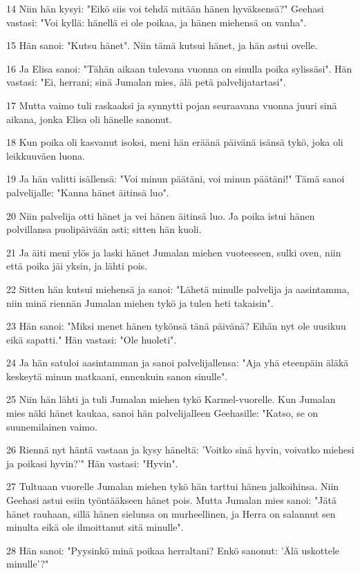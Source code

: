 \par 14 Niin hän kysyi: "Eikö siis voi tehdä mitään hänen hyväksensä?" Geehasi vastasi: "Voi kyllä: hänellä ei ole poikaa, ja hänen miehensä on vanha".
\par 15 Hän sanoi: "Kutsu hänet". Niin tämä kutsui hänet, ja hän astui ovelle.
\par 16 Ja Elisa sanoi: "Tähän aikaan tulevana vuonna on sinulla poika sylissäsi". Hän vastasi: "Ei, herrani; sinä Jumalan mies, älä petä palvelijatartasi".
\par 17 Mutta vaimo tuli raskaaksi ja synnytti pojan seuraavana vuonna juuri sinä aikana, jonka Elisa oli hänelle sanonut.
\par 18 Kun poika oli kasvanut isoksi, meni hän eräänä päivänä isänsä tykö, joka oli leikkuuväen luona.
\par 19 Ja hän valitti isällensä: "Voi minun päätäni, voi minun päätäni!" Tämä sanoi palvelijalle: "Kanna hänet äitinsä luo".
\par 20 Niin palvelija otti hänet ja vei hänen äitinsä luo. Ja poika istui hänen polvillansa puolipäivään asti; sitten hän kuoli.
\par 21 Ja äiti meni ylös ja laski hänet Jumalan miehen vuoteeseen, sulki oven, niin että poika jäi yksin, ja lähti pois.
\par 22 Sitten hän kutsui miehensä ja sanoi: "Lähetä minulle palvelija ja aasintamma, niin minä riennän Jumalan miehen tykö ja tulen heti takaisin".
\par 23 Hän sanoi: "Miksi menet hänen tykönsä tänä päivänä? Eihän nyt ole uusikuu eikä sapatti." Hän vastasi: "Ole huoleti".
\par 24 Ja hän satuloi aasintamman ja sanoi palvelijallensa: "Aja yhä eteenpäin äläkä keskeytä minun matkaani, ennenkuin sanon sinulle".
\par 25 Niin hän lähti ja tuli Jumalan miehen tykö Karmel-vuorelle. Kun Jumalan mies näki hänet kaukaa, sanoi hän palvelijalleen Geehasille: "Katso, se on suunemilainen vaimo.
\par 26 Riennä nyt häntä vastaan ja kysy häneltä: 'Voitko sinä hyvin, voivatko miehesi ja poikasi hyvin?'" Hän vastasi: "Hyvin".
\par 27 Tultuaan vuorelle Jumalan miehen tykö hän tarttui hänen jalkoihinsa. Niin Geehasi astui esiin työntääkseen hänet pois. Mutta Jumalan mies sanoi: "Jätä hänet rauhaan, sillä hänen sielunsa on murheellinen, ja Herra on salannut sen minulta eikä ole ilmoittanut sitä minulle".
\par 28 Hän sanoi: "Pyysinkö minä poikaa herraltani? Enkö sanonut: 'Älä uskottele minulle'?"
